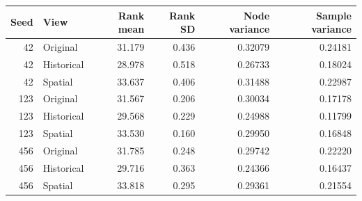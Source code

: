 \begingroup\color{revisionblue}
\sffamily\fontsize{9}{11}\selectfont\renewcommand{\arraystretch}{1.08}\setlength{\tabcolsep}{3pt}
\begin{tabular}{rlrrrr}

\toprule
Seed & View & Rank mean & Rank SD & Node variance & Sample variance \\
\midrule

42 & Original & 31.179 & 0.436 & 0.32079 & 0.24181 \\

42 & Historical & 28.978 & 0.518 & 0.26733 & 0.18024 \\

42 & Spatial & 33.637 & 0.406 & 0.31488 & 0.22987 \\

123 & Original & 31.567 & 0.206 & 0.30034 & 0.17178 \\

123 & Historical & 29.568 & 0.229 & 0.24988 & 0.11799 \\

123 & Spatial & 33.530 & 0.160 & 0.29950 & 0.16848 \\

456 & Original & 31.785 & 0.248 & 0.29742 & 0.22220 \\

456 & Historical & 29.716 & 0.363 & 0.24366 & 0.16437 \\

456 & Spatial & 33.818 & 0.295 & 0.29361 & 0.21554 \\

\bottomrule
\end{tabular}
\endgroup

